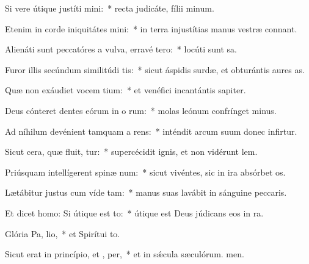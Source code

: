 \item Si vere útique justíti mini:~* recta judicáte, fílii minum.
\item Etenim in corde iniquitátes mini:~* in terra injustítias manus vestræ connant.
\item Alienáti sunt peccatóres a vulva, erravé  tero:~* locúti sunt sa.
\item Furor illis secúndum similitúdi tis:~* sicut áspidis surdæ, et obturántis aures as.
\item Quæ non exáudiet vocem tium:~* et venéfici incantántis sapiter.
\item Deus cónteret dentes eórum in o rum:~* molas leónum confrínget minus.
\item Ad níhilum devénient tamquam a rens:~* inténdit arcum suum donec infirtur.
\item Sicut cera, quæ fluit, tur:~* supercécidit ignis, et non vidérunt lem.
\item Priúsquam intellígerent spinæ  num:~* sicut vivéntes, sic in ira absórbet os.
\item Lætábitur justus cum víde tam:~* manus suas lavábit in sánguine peccaris.
\item Et dicet homo: Si útique est  to:~* útique est Deus júdicans eos in ra.
\item Glória Pa,  lio,~* et Spirítui to.
\item Sicut erat in princípio, et ,  per,~* et in sǽcula sæculórum. men.
